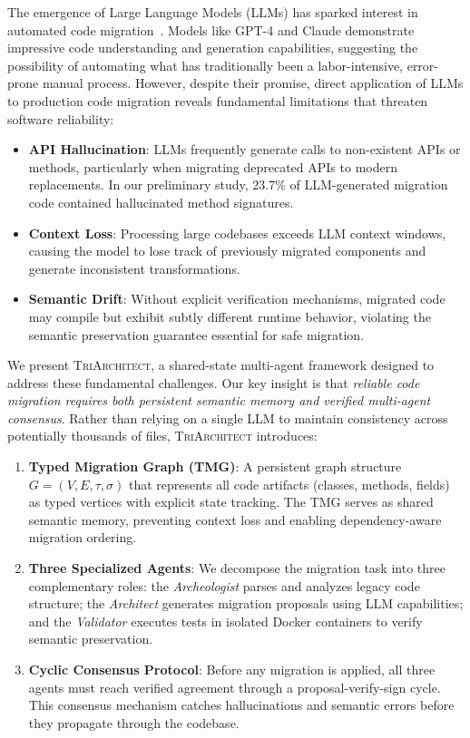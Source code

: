 \documentclass[sigconf,review,anonymous]{acmart}
\begin{document}
The emergence of Large Language Models (LLMs) has sparked interest in automated code migration~\cite{pan2024lossless,chen2021codex}. Models like GPT-4 and Claude demonstrate impressive code understanding and generation capabilities, suggesting the possibility of automating what has traditionally been a labor-intensive, error-prone manual process. However, despite their promise, direct application of LLMs to production code migration reveals fundamental limitations that threaten software reliability:

\begin{itemize}
    \item \textbf{API Hallucination}: LLMs frequently generate calls to non-existent APIs or methods, particularly when migrating deprecated APIs to modern replacements. In our preliminary study, 23.7\% of LLM-generated migration code contained hallucinated method signatures.
    
    \item \textbf{Context Loss}: Processing large codebases exceeds LLM context windows, causing the model to lose track of previously migrated components and generate inconsistent transformations.
    
    \item \textbf{Semantic Drift}: Without explicit verification mechanisms, migrated code may compile but exhibit subtly different runtime behavior, violating the semantic preservation guarantee essential for safe migration.
\end{itemize}

We present \textsc{TriArchitect}, a shared-state multi-agent framework designed to address these fundamental challenges. Our key insight is that \textit{reliable code migration requires both persistent semantic memory and verified multi-agent consensus}. Rather than relying on a single LLM to maintain consistency across potentially thousands of files, \textsc{TriArchitect} introduces:

\begin{enumerate}
    \item \textbf{Typed Migration Graph (TMG)}: A persistent graph structure $G = (V, E, \tau, \sigma)$ that represents all code artifacts (classes, methods, fields) as typed vertices with explicit state tracking. The TMG serves as shared semantic memory, preventing context loss and enabling dependency-aware migration ordering.
    
    \item \textbf{Three Specialized Agents}: We decompose the migration task into three complementary roles: the \textit{Archeologist} parses and analyzes legacy code structure; the \textit{Architect} generates migration proposals using LLM capabilities; and the \textit{Validator} executes tests in isolated Docker containers to verify semantic preservation.
    
    \item \textbf{Cyclic Consensus Protocol}: Before any migration is applied, all three agents must reach verified agreement through a proposal-verify-sign cycle. This consensus mechanism catches hallucinations and semantic errors before they propagate through the codebase.
\end{enumerate}
\end{document}
